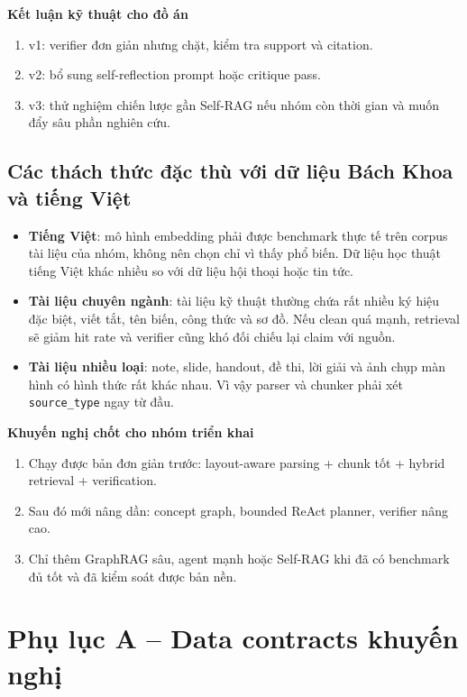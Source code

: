 \documentclass[12pt,a4paper]{article}
\begin{document}
\textbf{Kết luận kỹ thuật cho đồ án}
\begin{enumerate}[label=\arabic*.]
    \item v1: verifier đơn giản nhưng chặt, kiểm tra support và citation.
    \item v2: bổ sung self-reflection prompt hoặc critique pass.
    \item v3: thử nghiệm chiến lược gần Self-RAG nếu nhóm còn thời gian và muốn đẩy sâu phần nghiên cứu.
\end{enumerate}

\subsection{Các thách thức đặc thù với dữ liệu Bách Khoa và tiếng Việt}

\begin{itemize}
    \item \textbf{Tiếng Việt}: mô hình embedding phải được benchmark thực tế trên corpus tài liệu của nhóm, không nên chọn chỉ vì thấy phổ biến. Dữ liệu học thuật tiếng Việt khác nhiều so với dữ liệu hội thoại hoặc tin tức.
    \item \textbf{Tài liệu chuyên ngành}: tài liệu kỹ thuật thường chứa rất nhiều ký hiệu đặc biệt, viết tắt, tên biến, công thức và sơ đồ. Nếu clean quá mạnh, retrieval sẽ giảm hit rate và verifier cũng khó đối chiếu lại claim với nguồn.
    \item \textbf{Tài liệu nhiều loại}: note, slide, handout, đề thi, lời giải và ảnh chụp màn hình có hình thức rất khác nhau. Vì vậy parser và chunker phải xét \texttt{source\_type} ngay từ đầu.
\end{itemize}

\textbf{Khuyến nghị chốt cho nhóm triển khai}
\begin{enumerate}[label=\arabic*.]
    \item Chạy được bản đơn giản trước: layout-aware parsing + chunk tốt + hybrid retrieval + verification.
    \item Sau đó mới nâng dần: concept graph, bounded ReAct planner, verifier nâng cao.
    \item Chỉ thêm GraphRAG sâu, agent mạnh hoặc Self-RAG khi đã có benchmark đủ tốt và đã kiểm soát được bản nền.
\end{enumerate}

\section{Phụ lục A -- Data contracts khuyến nghị}
\end{document}
